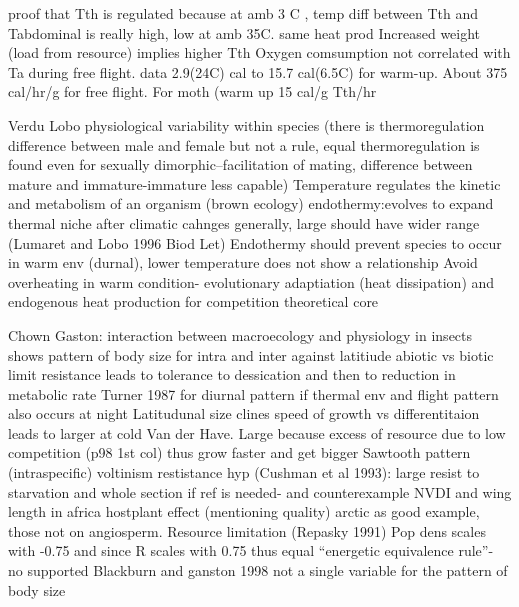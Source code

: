 proof that Tth is regulated because at amb 3 C , temp diff between Tth and Tabdominal is really high, low at amb 35C. same heat prod
Increased weight (load from resource) implies higher Tth
Oxygen comsumption not correlated with Ta during free flight.
 data 2.9(24C)  cal to 15.7 cal(6.5C) for warm-up. About 375 cal/hr/g for free flight. For moth (warm up 15 cal/g Tth/hr
 

Verdu Lobo
physiological variability within species (there is  thermoregulation difference between male and female but not a rule, equal thermoregulation is found even for sexually dimorphic--facilitation of mating, difference between mature and immature-immature less capable)
Temperature regulates the kinetic and metabolism of an organism (brown ecology)
endothermy:evolves to expand thermal niche after climatic cahnges
generally, large should have wider range   (Lumaret and Lobo 1996 Biod Let)
Endothermy should prevent species to occur in warm env (durnal), lower temperature does not show a relationship
Avoid overheating in warm condition- evolutionary adaptiation (heat dissipation) and endogenous heat production for competition
theoretical core
 
 
 Chown Gaston: 
 interaction between macroecology and physiology in insects
 shows pattern of body size for intra and inter against latitiude
 abiotic vs biotic limit
 resistance leads to tolerance to dessication and then to reduction in metabolic rate 
 Turner 1987 for diurnal pattern if thermal env and flight pattern also occurs at night
 Latitudunal size clines
 speed of growth vs differentitaion leads to larger at cold Van der Have.
 Large because excess of resource due to low competition (p98 1st col) thus grow faster and get bigger
 Sawtooth pattern (intraspecific) voltinism
 restistance hyp (Cushman et al 1993): large resist to starvation and whole section if ref is needed- and counterexample NVDI and wing length in africa
 hostplant effect (mentioning quality) arctic as good example, those not on angiosperm. Resource limitation (Repasky 1991)
 Pop dens scales with -0.75  and since R scales  with 0.75 thus equal ``energetic equivalence rule''- no supported Blackburn and ganston 1998
 not a single variable for the pattern of body size
 
 
